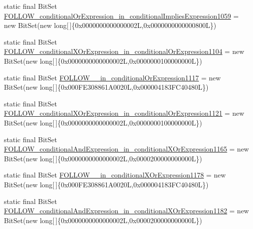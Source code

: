 \begin{DoxyCompactItemize}
\item 
static final Bit\-Set \hyperlink{classorg_1_1tzi_1_1use_1_1parser_1_1testsuite_1_1_test_suite_parser_aee953ce35ad933b3b503662f1706e2ef}{F\-O\-L\-L\-O\-W\-\_\-conditional\-Or\-Expression\-\_\-in\-\_\-conditional\-Implies\-Expression1059} = new Bit\-Set(new long\mbox{[}$\,$\mbox{]}\{0x0000000000000002\-L,0x0000000000000800\-L\})
\item 
static final Bit\-Set \hyperlink{classorg_1_1tzi_1_1use_1_1parser_1_1testsuite_1_1_test_suite_parser_a86c2d3379fc03c7db5e28b26d6cefd6b}{F\-O\-L\-L\-O\-W\-\_\-conditional\-X\-Or\-Expression\-\_\-in\-\_\-conditional\-Or\-Expression1104} = new Bit\-Set(new long\mbox{[}$\,$\mbox{]}\{0x0000000000000002\-L,0x0000000100000000\-L\})
\item 
static final Bit\-Set \hyperlink{classorg_1_1tzi_1_1use_1_1parser_1_1testsuite_1_1_test_suite_parser_a3948b4207cb8927d05b9a8c20f305fdb}{F\-O\-L\-L\-O\-W\-\_\-\_\-in\-\_\-conditional\-Or\-Expression1117} = new Bit\-Set(new long\mbox{[}$\,$\mbox{]}\{0x000\-F\-E308861\-A0020\-L,0x000004183\-F\-C40480\-L\})
\item 
static final Bit\-Set \hyperlink{classorg_1_1tzi_1_1use_1_1parser_1_1testsuite_1_1_test_suite_parser_a36082bcdadcb10b4d5968fa02472e5c2}{F\-O\-L\-L\-O\-W\-\_\-conditional\-X\-Or\-Expression\-\_\-in\-\_\-conditional\-Or\-Expression1121} = new Bit\-Set(new long\mbox{[}$\,$\mbox{]}\{0x0000000000000002\-L,0x0000000100000000\-L\})
\item 
static final Bit\-Set \hyperlink{classorg_1_1tzi_1_1use_1_1parser_1_1testsuite_1_1_test_suite_parser_ae51523cd77a8749e8f7a10b9c398b1c2}{F\-O\-L\-L\-O\-W\-\_\-conditional\-And\-Expression\-\_\-in\-\_\-conditional\-X\-Or\-Expression1165} = new Bit\-Set(new long\mbox{[}$\,$\mbox{]}\{0x0000000000000002\-L,0x0000200000000000\-L\})
\item 
static final Bit\-Set \hyperlink{classorg_1_1tzi_1_1use_1_1parser_1_1testsuite_1_1_test_suite_parser_ad9a4b484dfd2234b0f1777526ba9e8d6}{F\-O\-L\-L\-O\-W\-\_\-\_\-in\-\_\-conditional\-X\-Or\-Expression1178} = new Bit\-Set(new long\mbox{[}$\,$\mbox{]}\{0x000\-F\-E308861\-A0020\-L,0x000004183\-F\-C40480\-L\})
\item 
static final Bit\-Set \hyperlink{classorg_1_1tzi_1_1use_1_1parser_1_1testsuite_1_1_test_suite_parser_af46c8cafd69cab5af8bcaf089ce76dd5}{F\-O\-L\-L\-O\-W\-\_\-conditional\-And\-Expression\-\_\-in\-\_\-conditional\-X\-Or\-Expression1182} = new Bit\-Set(new long\mbox{[}$\,$\mbox{]}\{0x0000000000000002\-L,0x0000200000000000\-L\})
\item 

\end{DoxyCompactItemize}
